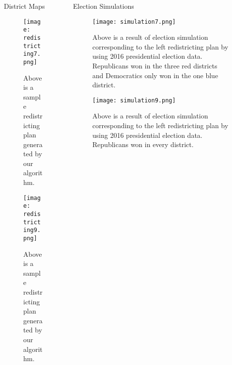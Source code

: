 \documentclass[leqno, handout]{beamer}
\theoremstyle{definition}
\begin{document}
\begin{frame}
\begin{columns}[t]

\begin{column}{.45\linewidth}

\begin{columns}[t]
\begin{column}{.48\linewidth}
\begin{block}{District Maps}
\vspace{1ex}
\begin{figure}
		\texttt{[image: redistricting7.png]}\\
		\caption{Above is a sample redistricting plan generated by our algorithm.}
		\end{figure}

\begin{figure}
		\texttt{[image: redistricting9.png]}\\
		\caption{Above is a sample redistricting plan generated by our algorithm.}
		\end{figure}



\end{block}
\end{column}


\begin{column}[t]{.48\linewidth}
\begin{block}{Election Simulations}
\begin{figure}
		\texttt{[image: simulation7.png]}\\
		\caption{Above is a result of election simulation corresponding to the left redistricting plan by using 2016 presidential election data. Republicans won in the three red districts and Democratics only won in the one blue district. }
		\end{figure}

\begin{figure}
		\texttt{[image: simulation9.png]}\\
		\caption{Above is a result of election simulation corresponding to the left redistricting plan by using 2016 presidential election data. Republicans won in every district. }
		\end{figure}



\end{block}
\end{column}
\end{columns}
\end{column}
\end{columns}
\end{frame}
\end{document}
